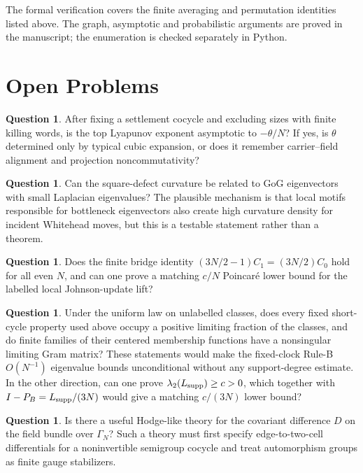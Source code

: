 \documentclass[11pt]{article}
\newcommand{\G}{\Gamma}
\theoremstyle{definition}
\newtheorem{question}[theorem]{Question}
\begin{document}
The formal verification covers the finite averaging and permutation
identities listed above. The graph, asymptotic and probabilistic arguments
are proved in the manuscript; the enumeration is checked separately in Python.

\section{Open Problems}

\begin{question}
After fixing a settlement cocycle and excluding sizes with finite killing
words, is the top Lyapunov exponent asymptotic to $-\theta/N$?  If yes, is
$\theta$ determined only by typical cubic expansion, or does it remember
carrier--field alignment and projection noncommutativity?
\end{question}

\begin{question}
Can the square-defect curvature be related to GoG eigenvectors with small
Laplacian eigenvalues?  The plausible mechanism is that local motifs
responsible for bottleneck eigenvectors
also create high curvature density for incident Whitehead moves, but this is a
testable statement rather than a theorem.
\end{question}

\begin{question}
Does the finite bridge identity
$(3N/2-1)C_1=(3N/2)C_0$ hold for all even $N$, and can one prove a matching
$c/N$ Poincar\'e lower bound for the labelled local Johnson-update lift?
\end{question}

\begin{question}
Under the uniform law on unlabelled classes, does every fixed short-cycle
property used above occupy a positive limiting fraction of the classes, and do
finite families of their centered membership functions have a nonsingular
limiting Gram matrix?  These statements would make the fixed-clock Rule-B
$O(N^{-1})$ eigenvalue bounds unconditional without any support-degree
estimate.  In the other direction, can one prove
$\lambda_2(L_{\rm supp})\ge c>0$, which together with
$I-P_B=L_{\rm supp}/(3N)$ would give a matching $c/(3N)$ lower bound?
\end{question}

\begin{question}
Is there a useful Hodge-like theory for the covariant difference $D$ on the
field bundle over $\G_N$?  Such a theory must first specify edge-to-two-cell
differentials for a noninvertible semigroup cocycle and treat automorphism
groups as finite gauge stabilizers.
\end{question}
\end{document}
